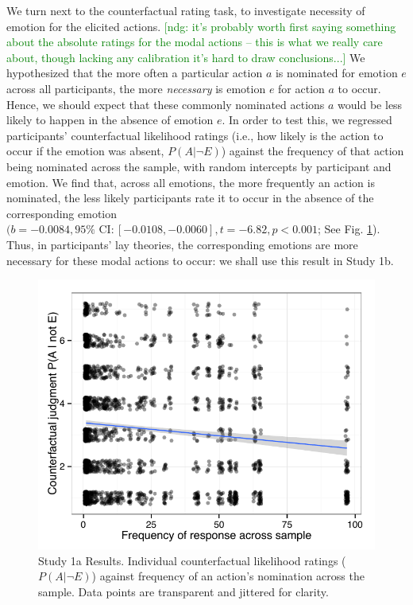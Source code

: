 \documentclass[10pt,letterpaper]{article}
\newcommand{\ndg}[1]{\textcolor{Green}{[ndg: #1]}}
\begin{document}



We turn next to the counterfactual rating task, to investigate necessity of emotion for the elicited actions. 
\ndg{it's probably worth first saying something about the absolute ratings for the modal actions -- this is what we really care about, though lacking any calibration it's hard to draw conclusions...}
We hypothesized that the more often a particular action $a$ is nominated for emotion $e$ across all participants, the more \textit{necessary} is emotion $e$ for action $a$ to occur. Hence, we should expect that these commonly nominated actions $a$ would be less likely to happen in the absence of emotion $e$. In order to test this, we regressed participants' counterfactual likelihood ratings (i.e., how likely is the action to occur if the emotion was absent, $P(A | \neg E)$) against the frequency of that action being nominated across the sample, with random intercepts by participant and emotion. 
We find that, across all emotions, the more frequently an action is nominated, the less likely participants rate it to occur in the absence of the corresponding emotion $(b = -0.0084, 95\% \text{ CI}: [-0.0108, -0.0060], t=-6.82, p<0.001$; See Fig. \ref{Study1aResultsFig}). 
Thus, in participants' lay theories, the corresponding emotions are more necessary for these modal actions to occur: we shall use this result in Study 1b.



\begin{figure}[htb!]
\begin{center}
	\includegraphics[width=0.85\columnwidth]{images/study1a_results.pdf}
\end{center}
\caption{ Study 1a Results. Individual counterfactual likelihood ratings ($P(A | \neg E)$) against frequency of an action's nomination across the sample. Data points are transparent and jittered for clarity. }
\label{Study1aResultsFig}
\end{figure}
\end{document}
